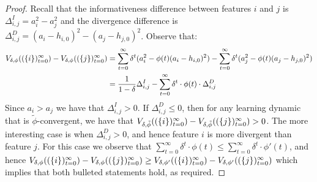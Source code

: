 \begin{proof}
    Recall that the informativeness difference between features $i$ and $j$ is  $\Delta^I_{i,j} = a^2_i - a^2_j$ and the divergence difference is $\Delta^D_{i,j} = (a_i - h_{i,0})^2 - (a_j - h_{j,0})^2$. Observe that:
    \begin{align*}
    V_{\delta,\phi}((\{i\})_{t=0}^\infty) - V_{\delta,\phi}((\{j\})_{t=0}^\infty) &= \sum_{t=0}^\infty \delta^t (a_i^2-\phi(t)(a_i-h_{i,0})^2) - \sum_{t=0}^\infty \delta^t (a_j^2-\phi(t)(a_j-h_{j,0})^2)  \\
    &= \frac{1}{1-\delta} \Delta^I_{i,j} - \sum_{t=0}^\infty \delta^t \cdot \phi(t) \cdot \Delta^D_{i,j}
    \end{align*}
    Since $a_i>a_j$ we have that $\Delta^I_{i,j}>0$. If $\Delta^D_{i,j} \leq 0$, then for any learning dynamic that is $\tilde \phi$-convergent, we have that $V_{\delta,\tilde\phi}((\{i\})_{t=0}^\infty) - V_{\delta,\tilde\phi}((\{j\})_{t=0}^\infty) > 0$. The more interesting case is when $\Delta^D_{i,j} > 0$, and hence feature $i$ is more divergent than feature $j$. For this case we observe that 
    $
\sum_{t=0}^\infty \delta^t \cdot \phi(t) \leq \sum_{t=0}^\infty \delta^t \cdot \phi'(t) 
    $,
and hence 
$
V_{\delta,\phi}((\{i\})_{t=0}^\infty) - V_{\delta,\phi}((\{j\})_{t=0}^\infty) \geq V_{\delta,\phi'}((\{i\})_{t=0}^\infty) - V_{\delta,\phi'}((\{j\})_{t=0}^\infty)
$
which implies that both bulleted statements hold, as required.   
\end{proof}


























